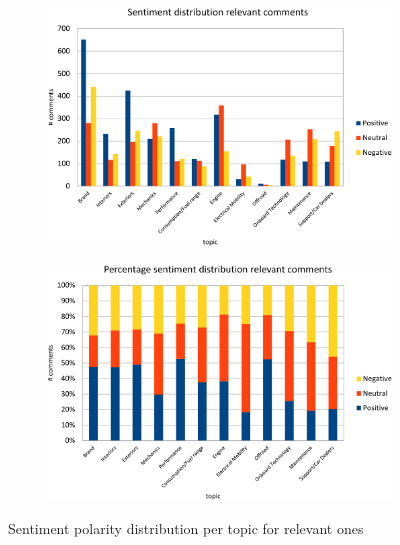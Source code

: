 \begin{figure}[ht]
	\centering
	\begin{subfigure}{.9\textwidth} %
		\includegraphics[width=1\textwidth]{figures/charts/sentiment-distribution-pdf2.pdf}
		\label{fig:sentiment-distribution}
	\end{subfigure}
		\vspace{-1cm} %
	\begin{subfigure}{.9\textwidth} %
		\includegraphics[width=1\textwidth]{figures/charts/sentiment-distribution-perc-pdf2.pdf}
	\label{fig:sentiment-distribution-perc}
	\end{subfigure}
	\vspace{1cm}
	\caption{Sentiment polarity distribution per topic for relevant ones} %
	\label{fig:annotations-relevant}
\end{figure}


